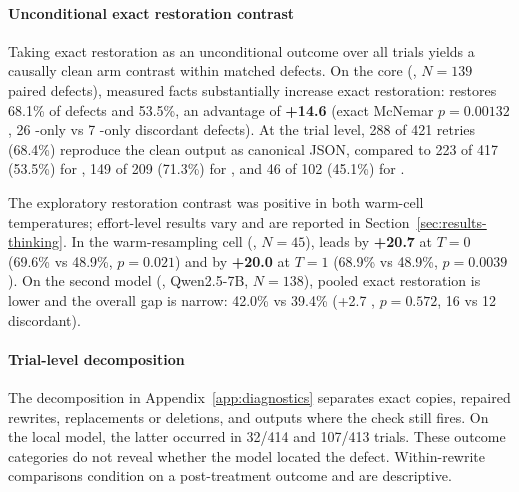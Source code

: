 \paragraph{Unconditional exact restoration contrast}
Taking exact restoration as an unconditional outcome over all trials yields a
causally clean arm contrast within matched defects. On the core (,
$N=139$ paired defects), measured facts substantially increase exact
restoration:  restores 68.1\% of defects and  53.5\%, an
advantage of \textbf{+14.6\pp{} } (exact McNemar $p=0.00132$,
26 -only vs 7 -only discordant defects). At the trial level,
288 of 421  retries (68.4\%) reproduce the clean output as canonical JSON,
compared to 223 of 417 (53.5\%) for , 149 of 209 (71.3\%) for ,
and 46 of 102 (45.1\%) for .

The exploratory restoration contrast was positive in both warm-cell temperatures; effort-level results vary and are reported in Section~\ref{sec:results-thinking}.
In the warm-resampling cell (, $N=45$),  leads  by
\textbf{+20.7\pp{} } at $T=0$ (69.6\% vs 48.9\%, $p=0.021$)
and by \textbf{+20.0\pp{} } at $T=1$ (68.9\% vs 48.9\%,
$p=0.0039$). On the second
model (, Qwen2.5-7B, $N=138$), pooled exact restoration is lower and the
overall gap is narrow:  42.0\% vs  39.4\% (+2.7\pp{} ,
$p=0.572$, 16 vs 12 discordant).

\paragraph{Trial-level decomposition}
The decomposition in Appendix~\ref{app:diagnostics} separates exact copies,
repaired rewrites, replacements or deletions, and outputs where the check
still fires. On the local model, the latter occurred in 32/414  and
107/413  trials. These outcome categories do not reveal whether the
model located the defect. Within-rewrite comparisons condition on a
post-treatment outcome and are descriptive.

